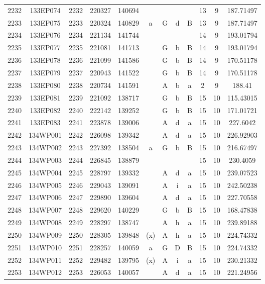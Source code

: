 \begin{tabular}{|*{12}{c|}}
2232 & 133EP074 & 2232 & 220327 & 140694 &  &  &  &  & 13 & 9 & 187.71497 \\ 
2233 & 133EP075 & 2233 & 220324 & 140829 & a & G & d & B & 13 & 9 & 187.71497 \\ 
2234 & 133EP076 & 2234 & 221134 & 141744 &  &  &  &  & 14 & 9 & 193.01794 \\ 
2235 & 133EP077 & 2235 & 221081 & 141713 &  & G & b & B & 14 & 9 & 193.01794 \\ 
2236 & 133EP078 & 2236 & 221099 & 141586 &  & G & b & B & 14 & 9 & 170.51178 \\ 
2237 & 133EP079 & 2237 & 220943 & 141522 &  & G & b & B & 14 & 9 & 170.51178 \\ 
2238 & 133EP080 & 2238 & 220734 & 141591 &  & A & b & a & 2 & 9 & 188.41 \\ 
2239 & 133EP081 & 2239 & 221092 & 138717 &  & G & b & B & 15 & 10 & 115.43015 \\ 
2240 & 133EP082 & 2240 & 222142 & 139252 &  & G & b & B & 15 & 10 & 171.01721 \\ 
2241 & 133EP083 & 2241 & 223878 & 139006 &  & A & d & a & 15 & 10 & 227.6042 \\ 
2242 & 134WP001 & 2242 & 226098 & 139342 &  & A & d & a & 15 & 10 & 226.92903 \\ 
2243 & 134WP002 & 2243 & 227392 & 138504 & a & G & b & B & 15 & 10 & 216.67497 \\ 
2244 & 134WP003 & 2244 & 226845 & 138879 &  &  &  &  & 15 & 10 & 230.4059 \\ 
2245 & 134WP004 & 2245 & 228797 & 139332 &  & A & d & a & 15 & 10 & 239.07523 \\ 
2246 & 134WP005 & 2246 & 229043 & 139091 &  & A & i & a & 15 & 10 & 242.50238 \\ 
2247 & 134WP006 & 2247 & 229890 & 139604 &  & A & d & a & 15 & 10 & 227.70558 \\ 
2248 & 134WP007 & 2248 & 229620 & 140229 &  & G & b & B & 15 & 10 & 168.47838 \\ 
2249 & 134WP008 & 2249 & 228297 & 138747 &  & A & h & a & 15 & 10 & 239.89188 \\ 
2250 & 134WP009 & 2250 & 228305 & 139848 & (x) & A & h & a & 15 & 10 & 224.74332 \\ 
2251 & 134WP010 & 2251 & 228257 & 140059 & a & G & D & B & 15 & 10 & 224.74332 \\ 
2252 & 134WP011 & 2252 & 229482 & 139795 & (x) & A & i & a & 15 & 10 & 230.21332 \\ 
2253 & 134WP012 & 2253 & 226053 & 140057 &  & A & d & a & 15 & 10 & 221.24956 \\ 

\end{tabular}
